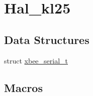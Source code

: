 \hypertarget{group__hal__kl25}{}\section{Hal\+\_\+kl25}
\label{group__hal__kl25}
\subsection*{Data Structures}
\begin{DoxyCompactItemize}
\item 
struct \hyperlink{structxbee__serial__t}{xbee\+\_\+serial\+\_\+t}
\end{DoxyCompactItemize}
\subsection*{Macros}
